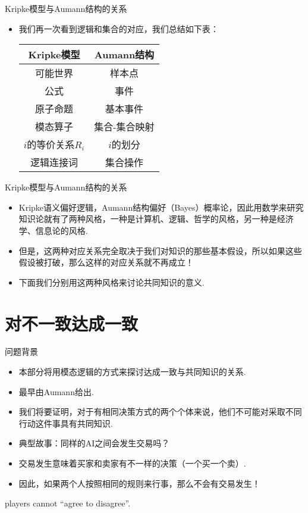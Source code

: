 {Kripke模型与Aumann结构的关系}
\begin{itemize}
    \item 我们再一次看到逻辑和集合的对应，我们总结如下表：
    \begin{table}[ht]
        \centering
        \begin{tabular}{cc}
        \toprule
             Kripke模型&Aumann结构  \\\midrule
             可能世界&样本点\\
             公式&事件\\
             原子命题&基本事件\\
             模态算子&集合-集合映射\\
             $i$的等价关系$R_i$&$i$的划分\\
             逻辑连接词&集合操作\\\bottomrule
        \end{tabular}
    \end{table}
\end{itemize}


{Kripke模型与Aumann结构的关系}
\begin{itemize}
    \item Kripke语义偏好逻辑，Aumann结构偏好（Bayes）概率论，因此用数学来研究知识论就有了两种风格，一种是计算机、逻辑、哲学的风格，另一种是经济学、信息论的风格.
    \item 但是，这两种对应关系完全取决于我们对知识的那些基本假设，所以如果这些假设被打破，那么这样的对应关系就不再成立！
    \item 下面我们分别用这两种风格来讨论共同知识的意义.
\end{itemize}


\section{对不一致达成一致}
{问题背景}
\begin{itemize}
    \item 本部分将用模态逻辑的方式来探讨达成一致与共同知识的关系.
    \item 最早由Aumann给出.
    \item 我们将要证明，对于有相同决策方式的两个个体来说，他们不可能对采取不同行动这件事具有共同知识.
    \item 典型故事：同样的AI之间会发生交易吗？
    \item 交易发生意味着买家和卖家有不一样的决策（一个买一个卖）.
    \item 因此，如果两个人按照相同的规则来行事，那么不会有交易发生！
\end{itemize}
\begin{center}
    players cannot ``agree to disagree''.
\end{center}



